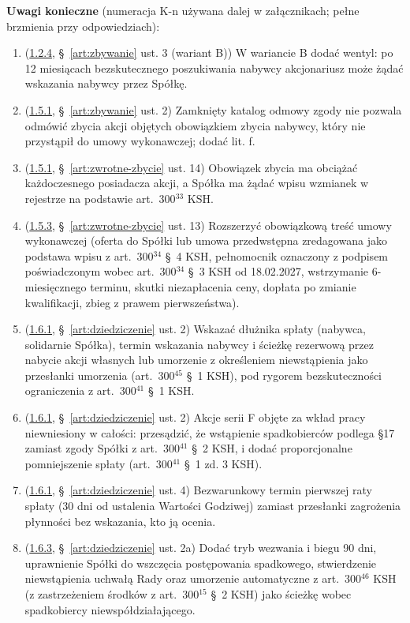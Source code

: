 \documentclass[12pt,a4paper]{report}
\begin{document}
\textbf{Uwagi konieczne} (numeracja K-n używana dalej w załącznikach; pełne brzmienia przy odpowiedziach):
\begin{enumerate}[label=K\arabic*.,leftmargin=2.6em]
  \item (\hyperref[memo:1.2.4]{1.2.4}, §~\ref{art:zbywanie} ust. 3 (wariant B)) W wariancie B dodać wentyl: po 12 miesiącach bezskutecznego poszukiwania nabywcy akcjonariusz może żądać wskazania nabywcy przez Spółkę.
  \item (\hyperref[memo:1.5.1]{1.5.1}, §~\ref{art:zbywanie} ust. 2) Zamknięty katalog odmowy zgody nie pozwala odmówić zbycia akcji objętych obowiązkiem zbycia nabywcy, który nie przystąpił do umowy wykonawczej; dodać lit. f.
  \item (\hyperref[memo:1.5.1]{1.5.1}, §~\ref{art:zwrotne-zbycie} ust. 14) Obowiązek zbycia ma obciążać każdoczesnego posiadacza akcji, a Spółka ma żądać wpisu wzmianek w rejestrze na podstawie art.~300$^{33}$ KSH.
  \item (\hyperref[memo:1.5.3]{1.5.3}, §~\ref{art:zwrotne-zbycie} ust. 13) Rozszerzyć obowiązkową treść umowy wykonawczej (oferta do Spółki lub umowa przedwstępna zredagowana jako podstawa wpisu z art.~300$^{34}$ §~4 KSH, pełnomocnik oznaczony z podpisem poświadczonym wobec art.~300$^{34}$ §~3 KSH od 18.02.2027, wstrzymanie 6-miesięcznego terminu, skutki niezapłacenia ceny, dopłata po zmianie kwalifikacji, zbieg z prawem pierwszeństwa).
  \item (\hyperref[memo:1.6.1]{1.6.1}, §~\ref{art:dziedziczenie} ust. 2) Wskazać dłużnika spłaty (nabywca, solidarnie Spółka), termin wskazania nabywcy i ścieżkę rezerwową przez nabycie akcji własnych lub umorzenie z określeniem niewstąpienia jako przesłanki umorzenia (art.~300$^{45}$ §~1 KSH), pod rygorem bezskuteczności ograniczenia z art.~300$^{41}$ §~1 KSH.
  \item (\hyperref[memo:1.6.1]{1.6.1}, §~\ref{art:dziedziczenie} ust. 2) Akcje serii F objęte za wkład pracy niewniesiony w całości: przesądzić, że wstąpienie spadkobierców podlega §17 zamiast zgody Spółki z art.~300$^{41}$ §~2 KSH, i dodać proporcjonalne pomniejszenie spłaty (art.~300$^{41}$ §~1 zd. 3 KSH).
  \item (\hyperref[memo:1.6.1]{1.6.1}, §~\ref{art:dziedziczenie} ust. 4) Bezwarunkowy termin pierwszej raty spłaty (30 dni od ustalenia Wartości Godziwej) zamiast przesłanki zagrożenia płynności bez wskazania, kto ją ocenia.
  \item (\hyperref[memo:1.6.3]{1.6.3}, §~\ref{art:dziedziczenie} ust. 2a) Dodać tryb wezwania i biegu 90 dni, uprawnienie Spółki do wszczęcia postępowania spadkowego, stwierdzenie niewstąpienia uchwałą Rady oraz umorzenie automatyczne z art.~300$^{46}$ KSH (z zastrzeżeniem środków z art.~300$^{15}$ §~2 KSH) jako ścieżkę wobec spadkobiercy niewspółdziałającego.

\end{enumerate}
\end{document}
